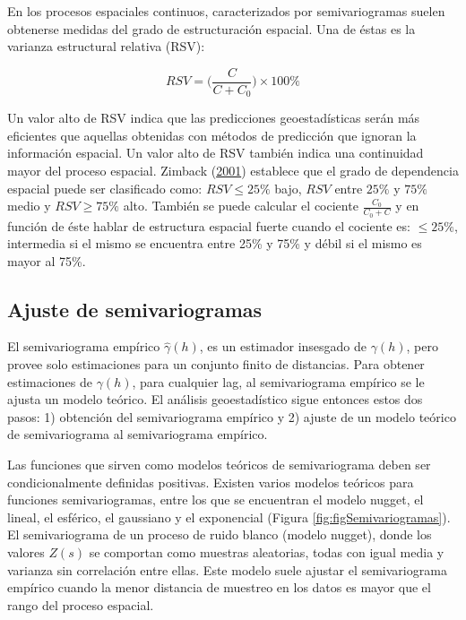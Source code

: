 \documentclass[11pt,b5paper,]{krantz}
\begin{document}
En los procesos espaciales continuos, caracterizados por semivariogramas suelen obtenerse medidas del grado de estructuración espacial. Una de éstas es la varianza estructural relativa (RSV):

\[RSV=\Bigg(\frac{C}{C+C_0}\Bigg)\times100\%\]

Un valor alto de RSV indica que las predicciones geoestadísticas serán más eficientes que aquellas obtenidas con métodos de predicción que ignoran la información espacial. Un valor alto de RSV también indica una continuidad mayor del proceso espacial. Zimback (\protect\hyperlink{ref-Zimback_2001}{2001}) establece que el grado de dependencia espacial puede ser clasificado como: \(RSV \leq 25\%\) bajo, \(RSV\) entre \(25\%\) y \(75\%\) medio y \(RSV \geq 75\%\) alto. También se puede calcular el cociente \(\frac{C_0}{C_0+C}\) y en función de éste hablar de estructura espacial fuerte cuando el cociente es: \(\leq 25\%\), intermedia si el mismo se encuentra entre 25\% y 75\% y débil si el mismo es mayor al 75\%.

\hypertarget{ajuste-de-semivariogramas}{%
\subsection{Ajuste de semivariogramas}\label{ajuste-de-semivariogramas}}

El semivariograma empírico \(\hat{\gamma}(h)\), es un estimador insesgado de \(\gamma(h)\), pero provee solo estimaciones para un conjunto finito de distancias. Para obtener estimaciones de \(\gamma(h)\), para cualquier lag, al semivariograma empírico se le ajusta un modelo teórico. El análisis geoestadístico sigue entonces estos dos pasos: 1) obtención del semivariograma empírico y 2) ajuste de un modelo teórico de semivariograma al semivariograma empírico.

Las funciones que sirven como modelos teóricos de semivariograma deben ser condicionalmente definidas positivas. Existen varios modelos teóricos para funciones semivariogramas, entre los que se encuentran el modelo nugget, el lineal, el esférico, el gaussiano y el exponencial (Figura \ref{fig:figSemivariogramas}). El semivariograma de un proceso de ruido blanco (modelo nugget), donde los valores \(Z\left(s\right)\) se comportan como muestras aleatorias, todas con igual media y varianza sin correlación entre ellas. Este modelo suele ajustar el semivariograma empírico cuando la menor distancia de muestreo en los datos es mayor que el rango del proceso espacial.
\end{document}
